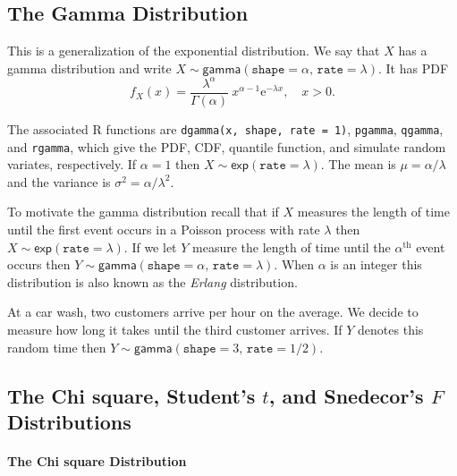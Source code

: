 \documentclass[captions=tableheading]{scrbook}
\begin{document}
\subsection{The Gamma Distribution}
\label{sec-6-5-2}

\label{sub:The-Gamma-Distribution}

This is a generalization of the exponential distribution. We say that \(X\) has a gamma distribution and write \(X\sim\mathsf{gamma}(\mathtt{shape}=\alpha,\,\mathtt{rate}=\lambda)\). It has PDF
\begin{equation}
f_{X}(x)=\frac{\lambda^{\alpha}}{\Gamma(\alpha)}\: x^{\alpha-1}\mathrm{e}^{-\lambda x},\quad x>0.
\end{equation}

The associated \textsf{R} functions are \texttt{dgamma(x, shape, rate = 1)}, \texttt{pgamma}, \texttt{qgamma}, and \texttt{rgamma}, which give the PDF, CDF, quantile function, and simulate random variates, respectively. If \(\alpha=1\) then \(X\sim\mathsf{exp}(\mathtt{rate}=\lambda)\). The mean is \(\mu=\alpha/\lambda\) and the variance is \(\sigma^{2}=\alpha/\lambda^{2}\).

To motivate the gamma distribution recall that if \(X\) measures the length of time until the first event occurs in a Poisson process with rate \(\lambda\) then \(X\sim\mathsf{exp}(\mathtt{rate}=\lambda)\). If we let \(Y\) measure the length of time until the \(\alpha^{\mathrm{th}}\) event occurs then \(Y\sim\mathsf{gamma}(\mathtt{shape}=\alpha,\,\mathtt{rate}=\lambda)\). When \(\alpha\) is an integer this distribution is also known as the \emph{Erlang} distribution.

\begin{example}
At a car wash, two customers arrive per hour on the average. We decide to measure how long it takes until the third customer arrives. If \(Y\) denotes this random time then \(Y\sim\mathsf{gamma}(\mathtt{shape}=3,\,\mathtt{rate}=1/2)\).
\end{example}
\subsection{The Chi square, Student's \(t\), and Snedecor's \(F\) Distributions}
\label{sec-6-5-3}

\label{sub:The-Chi-Square-t-F}

\paragraph*{The Chi square Distribution}
\label{sub:The-Chi-Square}
\end{document}

